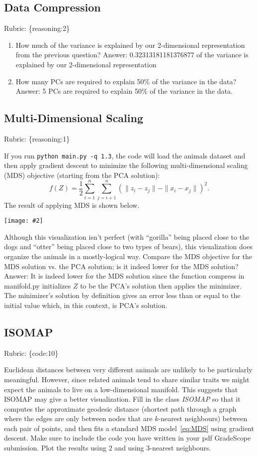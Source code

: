 \documentclass{article}
\def\rubric#1{\gre{Rubric: \{#1\}}}{}
\def\blu#1{{\color{blu}#1}}
\def\gre#1{{\color{gre}#1}}
\def\norm#1{\|#1\|}
\def\ans#1{\gre{Answer: #1}}{}
\newcommand{\centerfig}[2]{\begin{center}\texttt{[image: \#2]}\end{center}}
\def\enum#1{\begin{enumerate}#1\end{enumerate}}
\begin{document}
\subsection{Data Compression}
\rubric{reasoning:2}

\blu{\enum{
\item How much of the variance is explained by our 2-dimensional representation from the previous question?
\ans{0.32313181181376877 of the variance is explained by our 2-dimensional representation}
\item How many PCs are required to explain 50\% of the variance in the data?
\ans{5 PCs are required to explain 50\% of the variance in the data.}
}}


\subsection{Multi-Dimensional Scaling}
\rubric{reasoning:1}

If you run \verb|python main.py -q 1.3|, the code will load the animals dataset and then apply gradient descent to minimize the following multi-dimensional scaling (MDS) objective (starting from the PCA solution):
\begin{equation}
\label{eq:MDS}
f(Z) =  \frac{1}{2}\sum_{i=1}^n\sum_{j=i+1}^n (  \norm{z_i - z_j} - \norm{x_i - x_j})^2.
\end{equation}
 The result of applying MDS is shown below.
\centerfig{.5}{../figs/MDS_animals.png}
Although this visualization isn't perfect (with ``gorilla'' being placed close to the dogs and ``otter'' being placed close to two types of bears), this visualization does organize the animals in a mostly-logical way.
\blu{Compare the MDS objective for the MDS solution vs. the PCA solution; is it indeed lower for the MDS solution?} 
\ans{It is indeed lower for the MDS solution since the function compress in manifold.py initializes $Z$ to be the PCA's solution then applies the minimizer. The minimizer's solution by definition gives an error less than or equal to the initial value which, in this context, is PCA's solution.}
\subsection{ISOMAP}
\rubric{code:10}

Euclidean distances between very different animals are unlikely to be particularly meaningful.
However, since related animals tend to share similar traits we might expect the animals to live on a low-dimensional manifold.
This suggests that ISOMAP may give a better visualization.
Fill in the class \emph{ISOMAP} so that it computes the approximate geodesic distance
(shortest path through a graph where the edges are only between nodes that are $k$-nearest neighbours) between each pair of points,
and then fits a standard MDS model~\eqref{eq:MDS} using gradient descent. \blu{Make sure to include the code you have written in your pdf GradeScope submission. Plot the results using $2$ and using $3$-nearest neighbours}.
\end{document}
